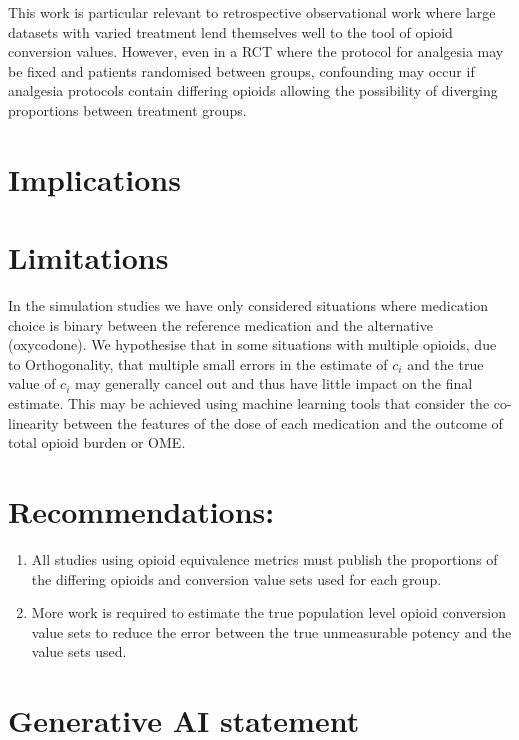 \documentclass[
  letterpaper,
  DIV=11,
  numbers=noendperiod]{scrreprt}
\begin{document}
This work is particular relevant to retrospective observational work
where large datasets with varied treatment lend themselves well to the
tool of opioid conversion values. However, even in a RCT where the
protocol for analgesia may be fixed and patients randomised between
groups, confounding may occur if analgesia protocols contain differing
opioids allowing the possibility of diverging proportions between
treatment groups.

\section{Implications}\label{implications}

\section{Limitations}\label{limitations}

In the simulation studies we have only considered situations where
medication choice is binary between the reference medication and the
alternative (oxycodone). We hypothesise that in some situations with
multiple opioids, due to Orthogonality, that multiple small errors in
the estimate of \(c_i\) and the true value of \(c_i\) may generally
cancel out and thus have little impact on the final estimate. This may
be achieved using machine learning tools that consider the co-linearity
between the features of the dose of each medication and the outcome of
total opioid burden or OME.

\section{Recommendations:}\label{recommendations}

\begin{enumerate}
\def\labelenumi{\arabic{enumi}.}
\item
  All studies using opioid equivalence metrics must publish the
  proportions of the differing opioids and conversion value sets used
  for each group.
\item
  More work is required to estimate the true population level opioid
  conversion value sets to reduce the error between the true
  unmeasurable potency and the value sets used.
\end{enumerate}

\section{Generative AI statement}\label{generative-ai-statement}
\end{document}
